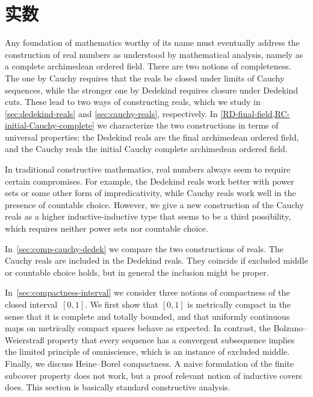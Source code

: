 \chapter{实数}
\label{cha:real-numbers}

%
Any foundation of mathematics worthy of its name must eventually address the construction of real numbers as understood by mathematical analysis, namely as a complete archimedean ordered field.
%
There are two notions of completeness. The one by Cauchy requires that the reals be closed under limits of Cauchy sequences, while the stronger one by Dedekind requires closure under Dedekind cuts.
These lead to two ways of constructing reals, which we study in \cref{sec:dedekind-reals} and \cref{sec:cauchy-reals}, respectively. In \cref{RD-final-field,RC-initial-Cauchy-complete} we characterize the two constructions in terms of universal properties: the Dedekind reals are the final archimedean ordered field, and the Cauchy reals the initial Cauchy complete archimedean ordered field.

In traditional constructive mathematics,
%
real numbers always seem to require certain compromises. For example, the Dedekind reals work better with power sets or some other form of impredicativity, while Cauchy reals work well in the presence of countable choice.
%
However, we give a new construction of the Cauchy reals as a higher inductive-inductive type that seems to be a third possibility, which requires neither power sets nor countable choice.

In~\cref{sec:comp-cauchy-dedek} we compare the two constructions of reals. The Cauchy reals are included in the Dedekind reals. They coincide if excluded middle or countable choice holds, but in general the inclusion might be proper.

In~\cref{sec:compactness-interval} we consider three notions of compactness of the closed interval~$[0,1]$. We first show that $[0,1]$ is metrically compact in the sense that it is complete and totally bounded, and that uniformly continuous maps on metrically compact spaces behave as expected. In contrast, the Bolzano--Weierstra\ss{} property that every sequence has a convergent subsequence implies the limited principle of omniscience, which is an instance of excluded middle. Finally, we discuss Heine--Borel compactness. A naive formulation of the finite subcover property does not work, but a proof relevant notion of inductive covers does.
This section is basically standard constructive analysis.

